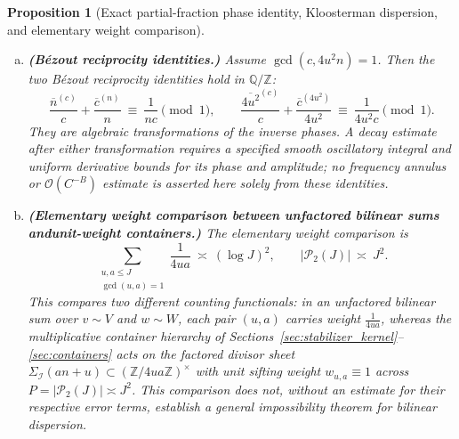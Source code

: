 \documentclass[11pt, a4paper]{article}
\theoremstyle{plain}
\newtheorem{proposition}[theorem]{Proposition}
\theoremstyle{definition}
\newcommand{\Z}{\mathbb{Z}}
\newcommand{\Q}{\mathbb{Q}}
\newcommand{\R}{\mathbb{R}}
\begin{document}
\begin{proposition}[Exact partial-fraction phase identity, Kloosterman dispersion, and elementary weight comparison]
\begin{enumerate}[(a)]
\[    \]
    with the same restrictions on $(u,a)$ as in the counting function. Poisson summation gives the exact identity
    \[
    \mathrm{ET}\ =\ \sum_{u,a}\sum_{h\ne0}e(-hu/a)\sum_{k\in\Z}\int_{\R}A_h(v)\,e\big(\theta_{h,k}(v)\big)\,dv,\qquad \theta_{h,k}(v)\ :=\ -\frac{hB}{a(4uav-1)}-kv.
    \]
    The $h$-sum is finite, with $|h|\ll S$. For $h\ne0$ a stationary point can occur only when $hk>0$; it is
    \[
    v_0\ =\ \frac{1}{4ua}\left(\sqrt{\frac{4uhB}{k}}+1\right),\qquad \theta''_{h,k}(v)\ =\ -\frac{32u^{2}ahB}{(4uav-1)^{3}}.
    \]
    The complete stationary phase, including $e(-hu/a)$, is
    \[
    -\frac{hu}{a}-\frac{k}{4ua}-\operatorname{sgn}(h)\sqrt{\frac{hk(an+u)}{ua^{2}}}.
    \]
    \item \textbf{(B\'ezout reciprocity identities.)} Assume $\gcd(c,4u^{2}n)=1$. Then the two B\'ezout reciprocity identities hold in $\Q/\Z$:
    \begin{equation}\label{eq:bezout_reciprocity_pair}
    \frac{\overline{n}^{(c)}}{c}+\frac{\overline{c}^{(n)}}{n}\ \equiv\ \frac{1}{nc}\pmod 1,\qquad \frac{\overline{4u^{2}}^{(c)}}{c}+\frac{\overline{c}^{(4u^{2})}}{4u^{2}}\ \equiv\ \frac{1}{4u^{2}c}\pmod 1.
    \end{equation}
    They are algebraic transformations of the inverse phases. A decay estimate after either transformation requires a specified smooth oscillatory integral and uniform derivative bounds for its phase and amplitude; no frequency annulus or $\mathcal{O}(C^{-B})$ estimate is asserted here solely from these identities.
    \item \textbf{(Elementary weight comparison between unfactored bilinear sums and\linebreak unit-weight containers.)} The elementary weight comparison is
    \[
    \sum_{\substack{u,a\le J\\ \gcd(u,a)=1}}\frac{1}{4ua}\ \asymp\ (\log J)^{2},\qquad \big|\mathcal{P}_2(J)\big|\ \asymp\ J^{2}.
    \]
    This compares two different counting functionals: in an unfactored bilinear sum over $v\sim V$ and $w\sim W$, each pair $(u,a)$ carries weight $\frac{1}{4ua}$, whereas the multiplicative container hierarchy of Sections~\ref{sec:stabilizer_kernel}--\ref{sec:containers} acts on the factored divisor sheet $\Sigma_{\mathcal{I}}(an+u)\subset(\Z/4ua\Z)^{\times}$ with unit sifting weight $w_{u,a}\equiv1$ across $P=|\mathcal{P}_2(J)|\asymp J^{2}$. This comparison does not, without an estimate for their respective error terms, establish a general impossibility theorem for bilinear dispersion.
\end{enumerate}
\end{proposition}
\end{document}
